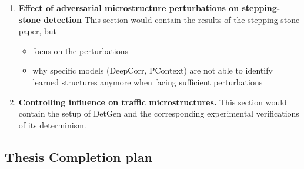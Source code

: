 \documentclass[a4paper,12pt,twoside]{article}
\begin{document}
\begin{enumerate}
\item \textbf{Effect of adversarial microstructure perturbations on stepping-stone detection}
This section would contain the results of the stepping-stone paper, but
 \begin{itemize}
 \item focus on the perturbations
 \item why specific models (DeepCorr, PContext) are not able to identify learned structures anymore when facing sufficient perturbations
 \end{itemize}
 

\item \textbf{Controlling influence on traffic microstructures.}
This section would contain the setup of DetGen and the corresponding experimental verifications of its determinism.




\end{enumerate}



\subsection{Thesis Completion plan}
\end{document}
